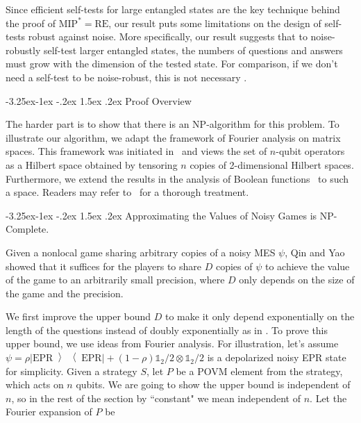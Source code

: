 \documentclass[10pt,a4paper]{article}
\makeatletter
\renewcommand{\subsection}{\@startsection{subsection}{2}{\z@}%
             {-3.25ex\@plus -1ex \@minus -.2ex}%
             {1.5ex \@plus .2ex}%
             {\normalfont\large\scshape\bfseries}}
\renewcommand{\subsubsection}{\@startsection{subsubsection}{2}{\z@}%
             {-3.25ex\@plus -1ex \@minus -.2ex}%
             {1.5ex \@plus .2ex}%
             {\normalfont\normalsize\scshape\bfseries}}
\theoremstyle{plain}
\theoremstyle{definition}
\newcommand {\ketbratwo} [2] {\ensuremath{ \left| #1 \middle\rangle \middle\langle #2 \right| }}
\newcommand {\ketbra} [1] {\ketbratwo{#1}{#1}}
\newcommand {\id} {\ensuremath{\mathds{1}}}
\newcommand{\1}{\mathbb{1}} %
\newcommand{\MIP}{\mathrm{MIP}}
\newcommand{\RE}{\mathrm{RE}}
\newcommand{\NP}{\mathrm{NP}}
\makeatother
\begin{document}
Since efficient self-tests for large entangled states are the key technique behind the proof of $\MIP^* = \RE$, our result puts some limitations on the design of self-tests robust against noise. 
More specifically, our result suggests that to noise-robustly self-test larger entangled states, the numbers of questions and answers must grow with the dimension of the tested state.
For comparison, if we don't need a self-test to be noise-robust, this is not necessary \cite{fu2019}. 


%
\subsection{Proof Overview}

The harder part is to show that there is an $\NP$-algorithm for this problem. 
To illustrate our algorithm, we adapt the framework of Fourier analysis on matrix spaces. This framework was initiated in~\cite{MO10,PhysRevA.84.052328} and views the set of $n$-qubit operators as a Hilbert space obtained by tensoring $n$ copies of 2-dimensional Hilbert spaces. Furthermore, we extend the results in the analysis of Boolean functions~\cite{Odonnell08} to such a space.
Readers may refer to~\cite{qin2021nonlocal} for a thorough treatment.

\subsubsection{Approximating the Values of Noisy Games is \texorpdfstring{$\NP$}{NP}-Complete.}  


Given a nonlocal game sharing arbitrary copies of a noisy MES $\psi$, 
 Qin and Yao \cite{qin2021nonlocal} showed that
it suffices for the players to share
 $D$ copies of $\psi$ to achieve the value of the game to an arbitrarily small precision, where $D$ only depends on the size of the game and the precision.

We first improve the upper bound $D$ to make it only depend exponentially on the length of the questions instead of doubly exponentially as in \cite{qin2021nonlocal}.
To prove this upper bound, we use ideas from Fourier analysis. For illustration, 
let's assume $\psi=\rho\ketbra{\mathrm{EPR}}+(1-\rho)\id_2/2\otimes\id_2/2$ is a depolarized noisy EPR state for simplicity. 
 Given a strategy $S$, let $P$ be a POVM element from the strategy, which acts on $n$ qubits.
 We are going to show the upper bound is independent of $n$, so in the rest of the section by ``constant" we mean independent of $n$.
 Let the Fourier expansion of $P$ be
\end{document}
